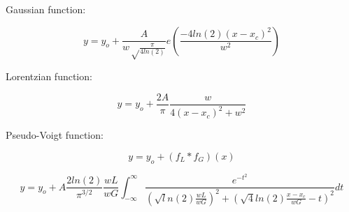 \documentclass{article}
\begin{document}
Gaussian function:

\begin{equation}
  y = y_{o} + \frac{ A }{ w\sqrt\frac{\pi}{4ln(2)} } e(\frac{ -4ln(2)(x-x_{c})^{2} }{ w^{2} })
\end{equation}

\vspace{3cm}

Lorentzian function:

\begin{equation}
  y = y_{o} + \frac{ 2A }{ \pi } \frac{ w }{ 4(x-x_{c})^{2} + {w}^{2} }
\end{equation}

\vspace{3cm}

Pseudo-Voigt function:

\begin{equation}
  y = y_{o} + (f_{L}*f_{G})(x)
\end{equation}

\begin{equation}
  y = y_{o} + A \frac{ 2ln(2) }{ \pi^{3/2} } \frac{ wL }{ wG } \int_{ -\infty }^{ \infty } \frac{ e^{-t^{2}} }{ (\sqrt ln(2)\frac{ wL }{ wG })^2+(\sqrt 4ln(2)\frac{ x-x_{c} }{ wG }-t)^2 } dt
\end{equation}
\end{document}
